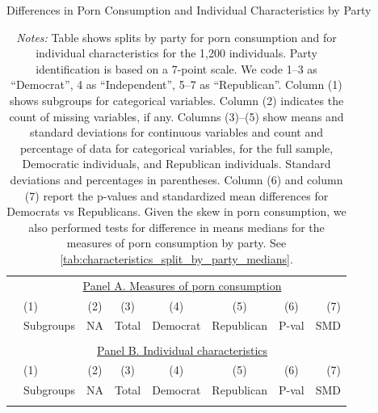 \documentclass[12pt, letterpaper]{article}
\begin{document}
\begin{table}[ht] \centering \small \setlength\tabcolsep{5 pt}
	\caption{Differences in Porn Consumption and Individual Characteristics by Party}
	\label{tab:characteristics_split_by_party}
	\begin{adjustbox}{max width=\textwidth}
		\begin{tabular}{@{\hspace{0\tabcolsep}}llrcccrr@{\hspace{0\tabcolsep}}}
			\toprule
			&\multicolumn{7}{c}{\underline{Panel A. Measures of porn consumption}}\\
			&\multicolumn{1}{l}{(1)}&\multicolumn{1}{c}{(2)}&\multicolumn{1}{c}{(3)}&\multicolumn{1}{c}{(4)}&\multicolumn{1}{c}{(5)}&\multicolumn{1}{c}{(6)}&\multicolumn{1}{r}{(7)}\\			
			&\multicolumn{1}{l}{Subgroups}&\multicolumn{1}{c}{NA}&\multicolumn{1}{c}{Total}&\multicolumn{1}{c}{Democrat}&\multicolumn{1}{c}{Republican}&\multicolumn{1}{c}{P-val}&\multicolumn{1}{r}{SMD}\\
			\cmidrule{2-8}
			\\
			\cmidrule{2-8}
			&\multicolumn{7}{c}{\underline{Panel B. Individual characteristics}}\\
			&\multicolumn{1}{l}{(1)}&\multicolumn{1}{c}{(2)}&\multicolumn{1}{c}{(3)}&\multicolumn{1}{c}{(4)}&\multicolumn{1}{c}{(5)}&\multicolumn{1}{c}{(6)}&\multicolumn{1}{r}{(7)}\\			
			&\multicolumn{1}{l}{Subgroups}&\multicolumn{1}{c}{NA}&\multicolumn{1}{c}{Total}&\multicolumn{1}{c}{Democrat}&\multicolumn{1}{c}{Republican}&\multicolumn{1}{c}{P-val}&\multicolumn{1}{r}{SMD}\\
			\cmidrule{2-8}
			\\
			\bottomrule
		\end{tabular}
	\end{adjustbox}
	\caption*{\scriptsize \emph{Notes:}
		Table shows splits by party for porn consumption and for individual characteristics for the 1,200 individuals.
		Party identification is based on a 7-point scale. We code 1--3 as ``Democrat'', 4 as ``Independent'', 5--7 as ``Republican''.
		Column (1) shows subgroups for categorical variables.
		Column (2) indicates the count of missing variables, if any.
		Columns (3)--(5) show means and standard deviations for continuous variables and count and percentage of data for categorical variables, for the full sample, Democratic individuals, and Republican individuals.
		Standard deviations and percentages in parentheses.
		Column (6) and column (7) report the p-values and standardized mean differences for Democrats vs Republicans.
		Given the skew in porn consumption, we also performed tests for difference in means medians for the measures of porn consumption by party. See \cref{tab:characteristics_split_by_party_medians}.
	}
\end{table}
\end{document}
